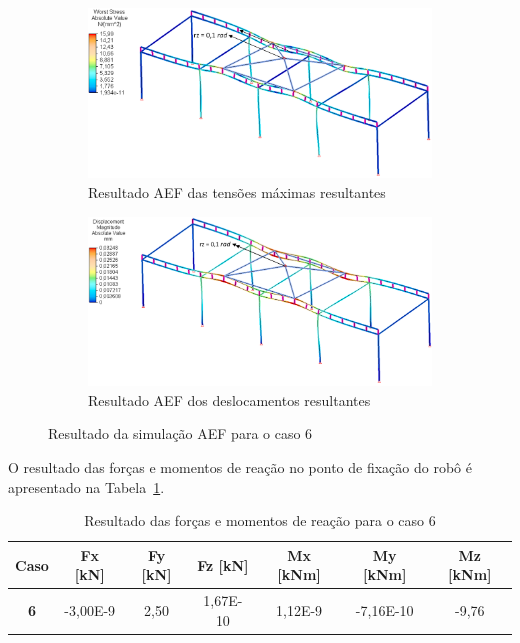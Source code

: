 \begin{figure}[h]
    \centering
    \begin{subfigure}[b]{0.90\textwidth}
        \includegraphics[width=\textwidth]{figs/res_FEA_tensoes}
        \caption{Resultado AEF das tensões máximas resultantes}
        \label{fig::res_FEA_tensoes}
    \end{subfigure}
    \quad %
    \begin{subfigure}[b]{0.90\textwidth}
        \includegraphics[width=\textwidth]{figs/res_FEA_desloc}
        \caption{Resultado AEF dos deslocamentos resultantes}
        \label{fig::res_FEA_desloc}
    \end{subfigure}
    \caption{Resultado da simulação AEF para o caso 6}
    \label{fig::res_FEA}
\end{figure}

O resultado das forças e momentos de reação no ponto de fixação do robô é
apresentado na Tabela~\ref{tab::res_FEA_forcas}. 

\begin{table}[h!]
\centering
\caption{Resultado das forças e momentos de reação para o caso 6}
\label{tab::res_FEA_forcas}
\begin{tabular}{@{}ccccccc@{}}
\toprule
\textbf{Caso} & \textbf{Fx [kN]} & \textbf{Fy [kN]} & \textbf{Fz [kN]} &
\textbf{Mx [kNm]} & \textbf{My [kNm]} & \textbf{Mz [kNm]} \\ \midrule \textbf{6}   
& -3,00E-9 & 2,50    & 1,67E-10    & 1,12E-9    & -7,16E-10   & -9,76   \\
\bottomrule
\end{tabular}
\end{table}


